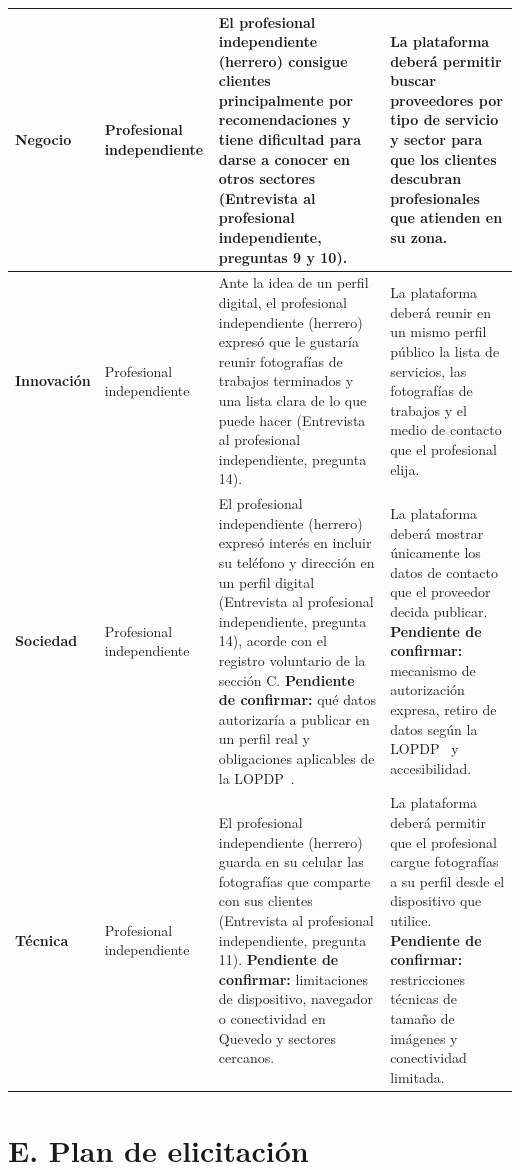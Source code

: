 \documentclass[11pt,a4paper]{article}
\begin{document}
\begin{table}[H]
\begin{tabularx}{\textwidth}{|L{2.05cm}|L{2.55cm}|>{\hsize}Y|>{\hsize}Y|}
\hline
\textbf{Negocio} & Profesional independiente & El profesional independiente (herrero) consigue clientes principalmente por recomendaciones y tiene dificultad para darse a conocer en otros sectores (Entrevista al profesional independiente, preguntas 9 y 10). & La plataforma deber\'a permitir buscar proveedores por tipo de servicio y sector para que los clientes descubran profesionales que atienden en su zona. \\
\hline
\textbf{Innovaci\'on} & Profesional independiente & Ante la idea de un perfil digital, el profesional independiente (herrero) expres\'o que le gustar\'ia reunir fotograf\'ias de trabajos terminados y una lista clara de lo que puede hacer (Entrevista al profesional independiente, pregunta 14). & La plataforma deber\'a reunir en un mismo perfil p\'ublico la lista de servicios, las fotograf\'ias de trabajos y el medio de contacto que el profesional elija. \\
\hline
\textbf{Sociedad} & Profesional independiente & El profesional independiente (herrero) expres\'o inter\'es en incluir su tel\'efono y direcci\'on en un perfil digital (Entrevista al profesional independiente, pregunta 14), acorde con el registro voluntario de la secci\'on C. \textbf{Pendiente de confirmar:} qu\'e datos autorizar\'ia a publicar en un perfil real y obligaciones aplicables de la LOPDP~\cite{lopdp2021}. & La plataforma deber\'a mostrar \'unicamente los datos de contacto que el proveedor decida publicar. \textbf{Pendiente de confirmar:} mecanismo de autorizaci\'on expresa, retiro de datos seg\'un la LOPDP~\cite{lopdp2021} y accesibilidad. \\
\hline
\textbf{T\'ecnica} & Profesional independiente & El profesional independiente (herrero) guarda en su celular las fotograf\'ias que comparte con sus clientes (Entrevista al profesional independiente, pregunta 11). \textbf{Pendiente de confirmar:} limitaciones de dispositivo, navegador o conectividad en Quevedo y sectores cercanos. & La plataforma deber\'a permitir que el profesional cargue fotograf\'ias a su perfil desde el dispositivo que utilice. \textbf{Pendiente de confirmar:} restricciones t\'ecnicas de tama\~no de im\'agenes y conectividad limitada. \\
\hline
\end{tabularx}
\end{table}

\section*{E. Plan de elicitaci\'on}
\end{document}

